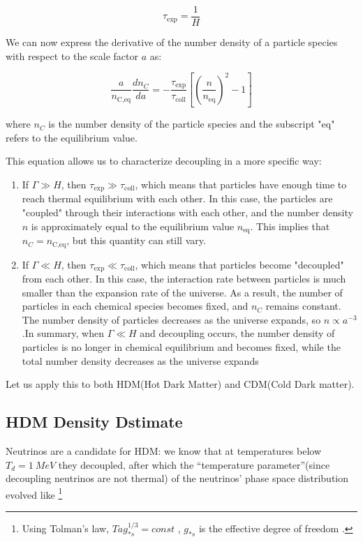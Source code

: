 \begin{equation}
\tau _{\text{exp}} = \frac{1}{H}
\end{equation}

We can now express the derivative of the number density of a particle species with respect to the scale factor $a$ as:

\begin{equation}
\frac{a}{n_{\text{C,eq}}} \frac{dn_C}{da} = -\frac{\tau_{\text{exp}}}{\tau_{\text{coll}}} \left[\left(\frac{n}{n_{\text{eq}}}\right)^2 - 1 \right]
\end{equation}

where $n_C$ is the number density of the particle species and the subscript "eq" refers to the equilibrium value.

This equation allows us to characterize decoupling in a more specific way:
\begin{enumerate}
    \item If $\Gamma \gg H$, then $\tau_{\text{exp}} \gg \tau_{\text{coll}}$, which means that particles have enough time to reach thermal equilibrium with each other. In this case, the particles are "coupled" through their interactions with each other, and the number density $n$ is approximately equal to the equilibrium value $n_{\text{eq}}$. This implies that $n_C = n_{\text{C,eq}}$, but this quantity can still vary.
    \item If $\Gamma \ll H$, then $\tau_{\text{exp}} \ll \tau_{\text{coll}}$, which means that particles become "decoupled" from each other. In this case, the interaction rate between particles is much smaller than the expansion rate of the universe. As a result, the number of particles in each chemical species becomes fixed, and $n_C$ remains constant. The number density of particles decreases as the universe expands, so $n \propto a^{-3}$.In summary, when $\Gamma \ll H$ and decoupling occurs, the number density of particles is no longer in chemical equilibrium and becomes fixed, while the total number density decreases as the universe expands
\end{enumerate}




Let us apply this to both HDM(Hot Dark Matter) and CDM(Cold Dark matter).

\subsection{HDM Density Dstimate}

\hspace{0.5cm}Neutrinos are a candidate for HDM: we know that at temperatures below \(T_d = \SI{1}{MeV}\) they decoupled, after which the ``temperature parameter''(since decoupling neutrinos are not thermal) of the neutrinos' phase space distribution evolved like \footnote{Using Tolman's law, \(T a g_{*s}^{1/3} = const\) , \(g_{*s} \) is the effective degree of freedom .}


